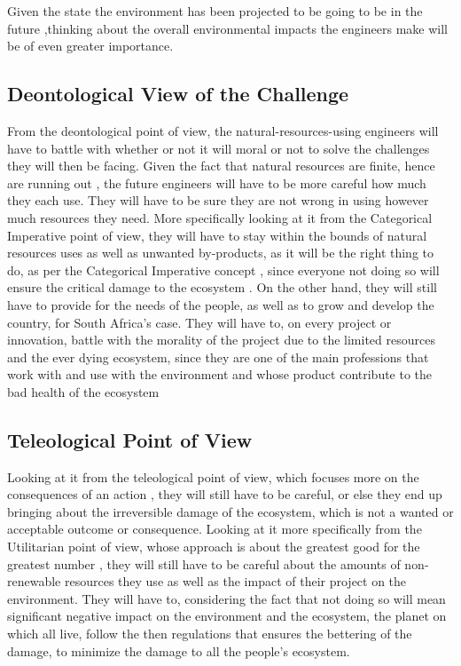 \documentclass[12pt]{witseiepaper}
\begin{document}
Given the state the environment has been projected to be going to be in the future \cite{collins2014long},thinking about the overall environmental impacts the engineers make will be of even greater importance. 

	\subsection{Deontological View of the Challenge} 

	From the deontological point of view, the natural-resources-using engineers will have to battle with whether or not it will moral or not to solve the challenges they will then be facing. Given the fact that natural resources are finite, hence are running out \cite{subramanian2018crisis}, the future engineers will have to be more careful how much they each use. They will have to be sure they are not wrong in using however much resources they need. More specifically looking at it from the Categorical Imperative point of view, they will have to stay within the bounds of natural resources uses as well as unwanted by-products, as it will be the right thing to do, as per the Categorical Imperative concept \cite{basara2018kant}, since everyone not doing so will ensure the critical damage to the ecosystem \cite{appannagari2017environmental}. On the other hand, they will still have to provide for the needs of the people, as well as to grow and develop the country, for South Africa’s case. They will have to, on every project or innovation, battle with the morality of the project due to the limited resources and the ever dying ecosystem, since they are one of the main professions that work with and use with the environment and whose product contribute to the bad health of the ecosystem  

	\subsection{Teleological Point of View} 

	Looking at it from the teleological point of view, which focuses more on the consequences of an action \cite{ismail2018narrative}, they will still have to be careful, or else they end up bringing about the irreversible damage of the ecosystem, which is not a wanted or acceptable outcome or consequence. Looking at it more specifically from the Utilitarian point of view, whose approach is about the greatest good for the greatest number \cite{ismail2018narrative}, they will still have to be careful about the amounts of non-renewable resources they use as well as the impact of their project on the environment. They will have to, considering the fact that not doing so will mean significant negative impact on the environment and the ecosystem, the planet on which all live, follow the then regulations that ensures the bettering of the damage, to minimize the damage to all the people’s ecosystem.
\end{document}
